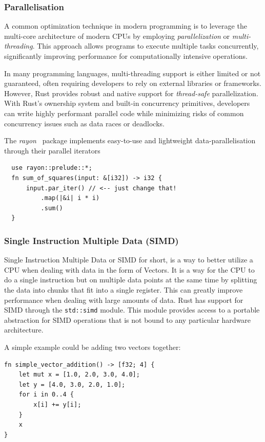 \documentclass[11pt]{report}
\theoremstyle{definition}
\theoremstyle{plain}
\begin{document}
\subsubsection{Parallelisation}
A common optimization technique in modern programming is to leverage the multi-core architecture of modern CPUs by employing \textit{parallelization} or \textit{multi-threading}. This approach allows programs to execute multiple tasks concurrently, significantly improving performance for computationally intensive operations.

In many programming languages, multi-threading support is either limited or not guaranteed, often requiring developers to rely on external libraries or frameworks. However, Rust provides robust and native support for \textit{thread-safe} parallelization. With Rust's ownership system and built-in concurrency primitives, developers can write highly performant parallel code while minimizing risks of common concurrency issues such as data races or deadlocks.

The \textit{rayon}~\cite{rayon} package implements easy-to-use and lightweight data-parallelisation through their parallel iterators
\begin{verbatim}
  use rayon::prelude::*;
  fn sum_of_squares(input: &[i32]) -> i32 {
      input.par_iter() // <-- just change that!
          .map(|&i| i * i)
          .sum()
  }
\end{verbatim}

\subsubsection{Single Instruction Multiple Data (SIMD)}
Single Instruction Multiple Data or SIMD for short, is a way to better utilize a CPU when dealing with data in the form of Vectors. It is a way for the CPU to do a single instruction but on multiple data points at the same time by splitting the data into chunks that fit into a single register. This can greatly improve performance when dealing with large amounts of data. Rust has support for SIMD through the \texttt{std::simd} module. This module provides access to a portable abstraction for SIMD operations that is not bound to any particular hardware architecture.

A simple example could be adding two vectors together:
\begin{verbatim}
fn simple_vector_addition() -> [f32; 4] {
    let mut x = [1.0, 2.0, 3.0, 4.0];
    let y = [4.0, 3.0, 2.0, 1.0];
    for i in 0..4 {
        x[i] += y[i];
    }
    x
}

\end{verbatim}
\end{document}
